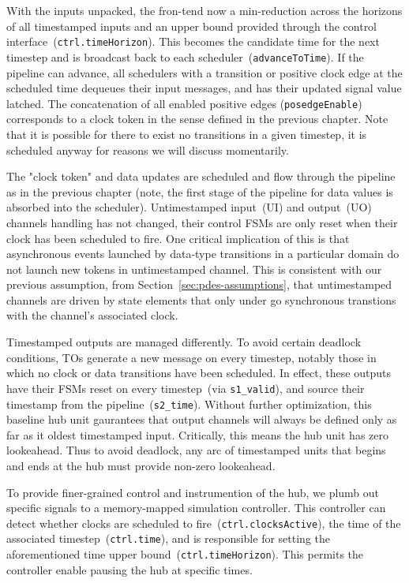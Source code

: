 With the inputs unpacked, the fron-tend now a min-reduction across the horizons of all timestamped
inputs and an upper bound provided through the control
interface~(\texttt{ctrl.timeHorizon}).  This becomes the candidate time for the
next timestep and is broadcast back to each
scheduler~(\texttt{advanceToTime}).  If the pipeline can advance, all schedulers
with a transition or positive clock edge at the scheduled time dequeues their
input messages, and has their updated signal value latched.  The concatenation of all
enabled positive edges (\texttt{posedgeEnable}) corresponds to a clock token in
the sense defined in the previous chapter. Note that it is possible for there to exist no
transitions in a given timestep, it is scheduled anyway for reasons we will
discuss momentarily.

The "clock token" and data updates are scheduled and flow through the pipeline
as in the previous chapter (note, the first stage of the pipeline for data values is absorbed into the scheduler).
Untimestamped input~(UI) and output~(UO) channels handling
has not changed, their control FSMs are only reset when their clock has been
scheduled to fire. One critical implication of this is that asynchronous events
launched by data-type transitions in a particular domain do not launch new
tokens in untimestamped channel. This is consistent with our previous
assumption, from Section~\ref{sec:pdes-assumptions}, that untimestamped channels are driven by state elements that only
under go synchronous transtions with the channel's associated clock.

Timestamped outputs are managed differently. To avoid certain deadlock
conditions, TOs generate a new message on every timestep,
notably those in which no clock or data transitions have been scheduled. In
effect, these outputs have their FSMs reset on every timestep~(via \texttt{s1\_valid}), and source their
timestamp from the pipeline~(\texttt{s2\_time}).  Without further
optimization, this baseline hub unit gaurantees that output channels will
always be defined only as far as it oldest timestamped input.  Critically, this
means the hub unit has zero lookeahead. Thus to avoid deadlock,
any arc of timestamped units that begins and ends at the hub must provide non-zero lookeahead.

To provide finer-grained control and instrumention of the hub, we plumb out
specific signals to a memory-mapped simulation controller. This controller can
detect whether clocks are scheduled to fire~(\texttt{ctrl.clocksActive}), the
time of the associated timestep~(\texttt{ctrl.time}), and is responsible for
setting the aforementioned time upper bound~(\texttt{ctrl.timeHorizon}). This permits the controller
enable pausing the hub at specific times.

